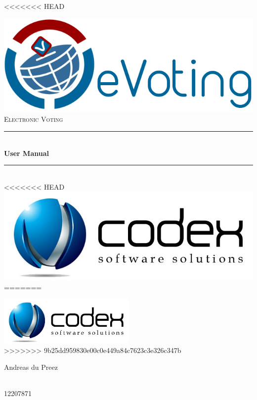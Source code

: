 <<<<<<< HEAD
\begin{titlepage}
	
	\begin{center}
		\includegraphics[width=0.7\linewidth]{../Images/eVoting_Logo.png}\\[2cm]    
		\textsc{\LARGE Electronic Voting}\\[0.5cm]
		\rule{\linewidth}{0.5mm} \\[1cm]
		{ \huge \bfseries User Manual}\\[0.5cm]
		\rule{\linewidth}{0.5mm} \\[1cm]
		
<<<<<<< HEAD
		\includegraphics[width=0.5\linewidth]{../Images/TeamCodexLogo.jpg}\\[0.5cm]    	
=======
		
		\includegraphics[width=0.5\textwidth]{../Images/TeamCodexLogo.jpg}\\[0.5cm]    	
>>>>>>> 9b25dd959830e00c0e449a84c7623c3e326c347b
		
		
		\begin{minipage}{0.4\textwidth}
			\begin{flushleft} \large
				Andreas {du Preez}
			\end{flushleft}
		\end{minipage}
		\begin{minipage}{0.4\textwidth}
			\begin{flushright} \large
				\emph{} \\
				12207871 
			\end{flushright}
		\end{minipage}
		

\end{center}
\end{titlepage}
